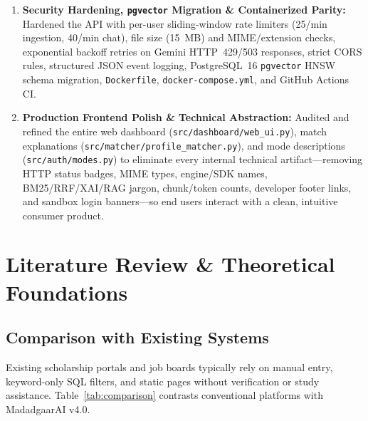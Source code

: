 \documentclass[12pt,a4paper,oneside]{report}
\begin{document}
\begin{enumerate}[itemsep=4pt]
    \item \textbf{Security Hardening, \texttt{pgvector} Migration \& Containerized Parity:} Hardened the API with per-user sliding-window rate limiters (25/min ingestion, 40/min chat), file size (15~MB) and MIME/extension checks, exponential backoff retries on Gemini HTTP~429/503 responses, strict CORS rules, structured JSON event logging, PostgreSQL~16 \texttt{pgvector} HNSW schema migration, \texttt{Dockerfile}, \texttt{docker-compose.yml}, and GitHub Actions CI.
    \item \textbf{Production Frontend Polish \& Technical Abstraction:} Audited and refined the entire web dashboard (\texttt{src/dashboard/web\_ui.py}), match explanations (\texttt{src/matcher/profile\_matcher.py}), and mode descriptions (\texttt{src/auth/modes.py}) to eliminate every internal technical artifact—removing HTTP status badges, MIME types, engine/SDK names, BM25/RRF/XAI/RAG jargon, chunk/token counts, developer footer links, and sandbox login banners—so end users interact with a clean, intuitive consumer product.
\end{enumerate}

\chapter[Literature Review]{Literature Review \& Theoretical Foundations}

\section{Comparison with Existing Systems}
Existing scholarship portals and job boards typically rely on manual entry, keyword-only SQL filters, and static pages without verification or study assistance. Table~\ref{tab:comparison} contrasts conventional platforms with MadadgaarAI v4.0.
\end{document}
